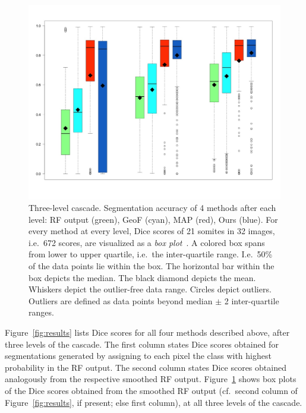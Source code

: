 \documentclass[10pt,twocolumn,letterpaper]{article}
\begin{document}
\begin{figure}[tb]
\centering
\small
\begin{center}
\includegraphics[width=\columnwidth]{Cascade.jpeg} %
\end{center}
\caption{Three-level cascade. Segmentation accuracy of 4 methods after each level: RF output (green), GeoF (cyan), MAP (red), Ours (blue). For every method at every level, Dice scores of 21 somites in 32 images, i.e.\ 672 scores, are visualized as a \emph{box plot}~\cite{chambers1983graphical}. A colored box spans from lower to upper quartile, i.e.\ the inter-quartile range. I.e.\ 50\% of the data points lie within the box. The horizontal bar within the box depicts the median. The black diamond depicts the mean. Whiskers depict the outlier-free data range. Circles depict outliers. Outliers are defined as data points beyond median $\pm$ 2 inter-quartile ranges. }
\label{fig:boxplots}
\end{figure}
%
Figure~\ref{fig:results} lists Dice scores for all four methods described above, after three levels of the cascade. The first column states Dice scores obtained for segmentations generated by assigning to each pixel the class with highest probability in the RF output. The second column states Dice scores obtained analogously from the respective smoothed RF output. Figure~\ref{fig:boxplots} shows box plots of the Dice scores obtained from the smoothed RF output (cf.\ second column of Figure~\ref{fig:results}, if present; else first column), at all three levels of the cascade. 
\end{document}
